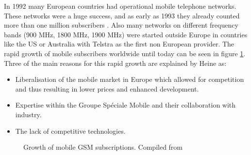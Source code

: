 In 1992 many European countries had operational mobile telephone networks.
These networks were a huge success, and as early as 1993 they already counted more than one million subscribers \cite{GSM2009}.
Also many networks on different frequency bands (900 MHz, 1800 MHz, 1900 MHz) were started outside Europe in countries like the US or Australia with Telstra as the first non European provider.
The rapid growth of mobile subscribers worldwide until today can be seen in figure \ref{fig:gsm_growth}.
Three of the main reasons for this rapid growth are explained by Heine \cite{protocols1999} as:
\begin{itemize}
	\item Liberalisation of the mobile market in Europe which allowed for competition and thus resulting in lower prices and enhanced development.
	\item Expertise within the Groupe Sp\'{e}ciale Mobile and their collaboration with industry.
	\item The lack of competitive technologies.
\end{itemize}

\begin{figure}
\centering
{}
\caption{Growth of mobile GSM subscriptions. Compiled from \cite{GSM2009,GSM_history2011,GSM_stats2011}}
\label{fig:gsm_growth}
\end{figure}


